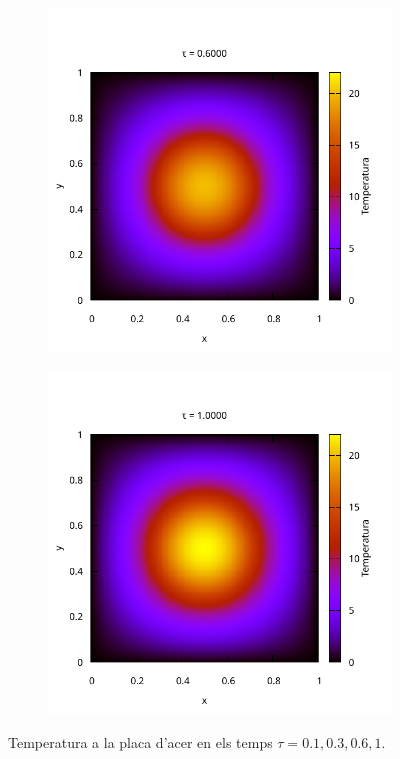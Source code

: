 \documentclass[10pt,a4paper]{article}
\theoremstyle{definition}
\theoremstyle{remark}
\begin{document}
\begin{figure}[ht]
\begin{subfigure}{0.49\linewidth}
  \end{subfigure}\\\vspace{-1cm}
  \begin{subfigure}{0.49\linewidth}
    \includegraphics[width=\textwidth]{../plot/Images/heatmap_00060.pdf}
  \end{subfigure}\hfill
  \begin{subfigure}{0.49\linewidth}
    \includegraphics[width=\textwidth]{../plot/Images/heatmap_00100.pdf}
  \end{subfigure}
  \caption{Temperatura a la placa d'acer en els temps $\tau=0.1,0.3,0.6,1$.}
\end{figure}
\end{document}
